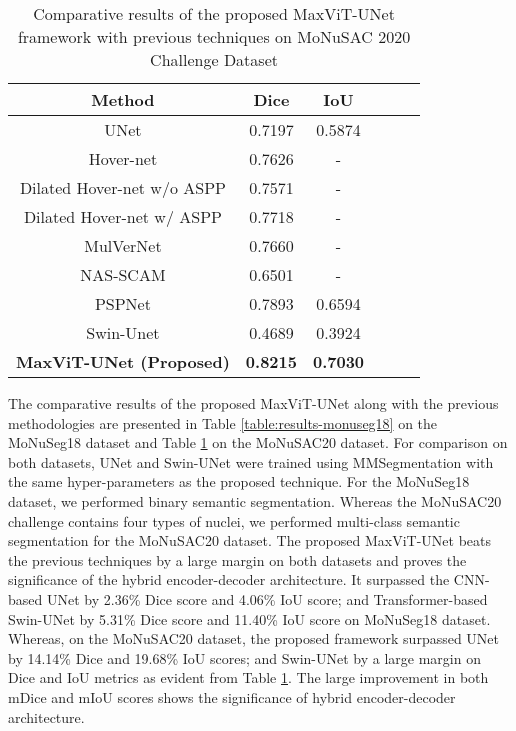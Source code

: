 \documentclass{article}
\begin{document}
\begin{table}[t!]
  \centering
  \caption{Comparative results of the proposed MaxViT-UNet framework with previous techniques on MoNuSAC 2020 Challenge Dataset}\label{table:results-monusac20}
  \begin{tabular*}{\textwidth}{@{\extracolsep\fill}cccccc}
    \toprule Method & Dice & IoU  \\ \hline
      UNet \cite{ronneberger2015u} & 0.7197 & 0.5874 \\
      Hover-net \cite{wang2023improved} & 0.7626 & - \\
      Dilated Hover-net w/o ASPP \cite{wang2023improved} & 0.7571 & - \\
      Dilated Hover-net w/ ASPP \cite{wang2023improved} & 0.7718 & - \\
      MulVerNet \cite{vo2023mulvernet} & 0.7660 & - \\
      NAS-SCAM \cite{liu2020scam} & 0.6501 & - \\
      PSPNet \cite{zhao2017pyramid} & 0.7893 & 0.6594 \\
      Swin-Unet \cite{cao2022swin} & 0.4689 & 0.3924 \\
      \textbf{MaxViT-UNet (Proposed)} & \textbf{0.8215} & \textbf{0.7030} \\
    \hline
  \end{tabular*}
\end{table}

The comparative results of the proposed MaxViT-UNet along with the previous methodologies are presented in Table \ref{table:results-monuseg18} on the MoNuSeg18 dataset and Table \ref{table:results-monusac20} on the MoNuSAC20 dataset. For comparison on both datasets, UNet and Swin-UNet were trained using MMSegmentation \cite{contributors2020openmmlab} with the same hyper-parameters as the proposed technique. For the MoNuSeg18 dataset, we performed binary semantic segmentation. Whereas the MoNuSAC20 challenge contains four types of nuclei, we performed multi-class semantic segmentation for the MoNuSAC20 dataset. The proposed MaxViT-UNet beats the previous techniques by a large margin on both datasets and proves the significance of the hybrid encoder-decoder architecture. It surpassed the CNN-based UNet \cite{ronneberger2015u} by 2.36\% Dice score and 4.06\% IoU score; and Transformer-based Swin-UNet \cite{cao2022swin} by 5.31\% Dice score and 11.40\% IoU score on MoNuSeg18 dataset. Whereas, on the MoNuSAC20 dataset, the proposed framework surpassed UNet \cite{ronneberger2015u} by 14.14\% Dice and 19.68\% IoU scores; and Swin-UNet \cite{cao2022swin} by a large margin on Dice and IoU metrics as evident from Table \ref{table:results-monusac20}. The large improvement in both mDice and mIoU scores shows the significance of hybrid encoder-decoder architecture.
\end{document}
